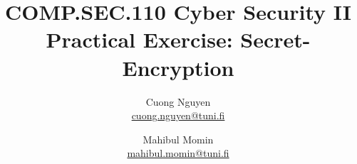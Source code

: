 \documentclass{article}
\title{COMP.SEC.110 Cyber Security II\\
    \large Practical Exercise: Secret-Encryption
}
\author{Cuong Nguyen\\ \href{mailto:cuong.nguyen@tuni.fi}{cuong.nguyen@tuni.fi} 
        \and Mahibul Momin\\ \href{mailto:mahibul.momin@tuni.fi}{mahibul.momin@tuni.fi}
}
\begin{document}
    
\maketitle
\tableofcontents
\newpage

\listoffigures
\newpage

% 
% 







\printbibliography{}
\end{document}
